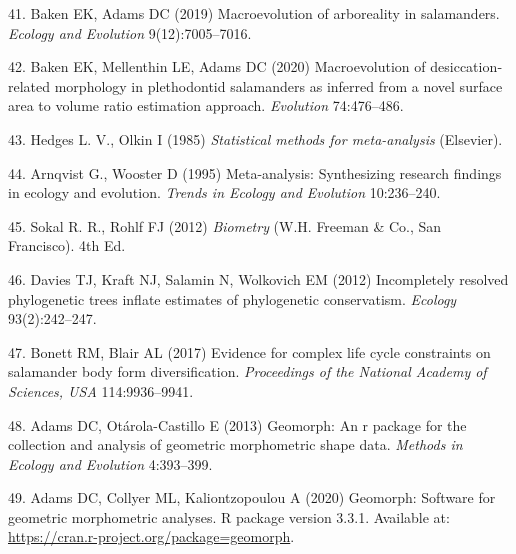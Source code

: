 \documentclass[9pt,twocolumn,twoside,lineno]{pnas-new}
\begin{document}
\leavevmode\hypertarget{ref-Baken2019}{}%
41. Baken EK, Adams DC (2019) Macroevolution of arboreality in
salamanders. \emph{Ecology and Evolution} 9(12):7005--7016.

\leavevmode\hypertarget{ref-Baken2020}{}%
42. Baken EK, Mellenthin LE, Adams DC (2020) Macroevolution of
desiccation‐related morphology in plethodontid salamanders as inferred
from a novel surface area to volume ratio estimation approach.
\emph{Evolution} 74:476--486.

\leavevmode\hypertarget{ref-HedgesOlkin1985}{}%
43. Hedges L. V., Olkin I (1985) \emph{Statistical methods for
meta-analysis} (Elsevier).

\leavevmode\hypertarget{ref-Arnqvist1995}{}%
44. Arnqvist G., Wooster D (1995) Meta-analysis: Synthesizing research
findings in ecology and evolution. \emph{Trends in Ecology and
Evolution} 10:236--240.

\leavevmode\hypertarget{ref-SokalRohlf2012}{}%
45. Sokal R. R., Rohlf FJ (2012) \emph{Biometry} (W.H. Freeman \& Co.,
San Francisco). 4th Ed.

\leavevmode\hypertarget{ref-Davies2012}{}%
46. Davies TJ, Kraft NJ, Salamin N, Wolkovich EM (2012) Incompletely
resolved phylogenetic trees inflate estimates of phylogenetic
conservatism. \emph{Ecology} 93(2):242--247.

\leavevmode\hypertarget{ref-Bonett2017}{}%
47. Bonett RM, Blair AL (2017) Evidence for complex life cycle
constraints on salamander body form diversification. \emph{Proceedings
of the National Academy of Sciences, USA} 114:9936--9941.

\leavevmode\hypertarget{ref-AdamsOtarola2013}{}%
48. Adams DC, Otárola-Castillo E (2013) Geomorph: An r package for the
collection and analysis of geometric morphometric shape data.
\emph{Methods in Ecology and Evolution} 4:393--399.

\leavevmode\hypertarget{ref-AdamsGeomorph}{}%
49. Adams DC, Collyer ML, Kaliontzopoulou A (2020) Geomorph: Software
for geometric morphometric analyses. R package version 3.3.1. Available
at: \url{https://cran.r-project.org/package=geomorph}.



% 
\end{document}
